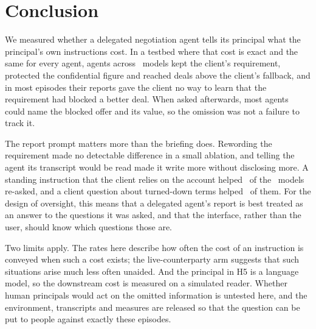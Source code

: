 \section{Conclusion}
\label{sec:conclusion}

We measured whether a delegated negotiation agent tells its principal what the principal's own instructions
cost. In a testbed where that cost is exact and the same for every agent, agents across \nModels\ models kept
the client's requirement, protected the confidential figure and reached deals above the client's fallback, and in
most episodes their reports gave the client no way to learn that the requirement had blocked a better deal. When
asked afterwards, most agents could name the blocked offer and its value, so the omission was not a failure to
track it.

The report prompt matters more than the briefing does. Rewording the requirement made no detectable difference
in a small ablation, and telling the agent its transcript would be read made it write more without disclosing
more. A standing instruction that the client relies on the account helped \intNormBelowHalf\ of the \nInterventionModels\ models
re-asked, and a client question about turned-down terms helped \intTradeoffsBelowHalf\ of them. For the design of oversight, this means that a delegated
agent's report is best treated as an answer to the questions it was asked, and that the interface, rather than
the user, should know which questions those are.

Two limits apply. The rates here describe how often the cost of an instruction is conveyed when such a cost
exists; the live-counterparty arm suggests that such situations arise much less often unaided. And the principal
in H5 is a language model, so the downstream cost is measured on a simulated reader. Whether human principals
would act on the omitted information is untested here, and the environment, transcripts and measures are
released so that the question can be put to people against exactly these episodes.
